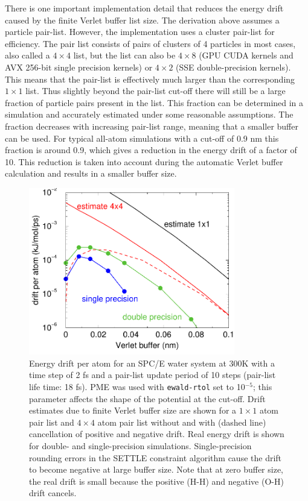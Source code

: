 {There is one important implementation detail that reduces the energy
drift caused by the finite Verlet buffer list size. The derivation
above assumes a particle pair-list. However, the {\gromacs}
implementation uses a cluster pair-list for efficiency. The pair list
consists of pairs of clusters of 4 particles in most cases, also
called a $4 \times 4$ list, but the list can also be $4 \times 8$ (GPU
CUDA kernels and AVX 256-bit single precision kernels) or $4 \times 2$
(SSE double-precision kernels). This means that the pair-list is
effectively much larger than the corresponding $1 \times 1$ list. Thus
slightly beyond the pair-list cut-off there will still be a large
fraction of particle pairs present in the list. This fraction can be
determined in a simulation and accurately estimated under some
reasonable assumptions. The fraction decreases with increasing
pair-list range, meaning that a smaller buffer can be used. For
typical all-atom simulations with a cut-off of 0.9 nm this fraction is
around 0.9, which gives a reduction in the energy drift of a factor of
10. This reduction is taken into account during the automatic Verlet
buffer calculation and results in a smaller buffer size.

\begin{figure}
\centerline{\includegraphics[width=9cm]{plots/verlet-drift}}
\caption {Energy drift per atom for an SPC/E water system at 300K with
  a time step of 2 fs and a pair-list update period of 10 steps
  (pair-list life time: 18 fs). PME was used with {\tt ewald-rtol} set
  to 10$^{-5}$; this parameter affects the shape of the potential at
  the cut-off. Drift estimates due to finite Verlet buffer size are
  shown for a $1 \times 1$ atom pair list and $4 \times 4$ atom pair
  list without and with (dashed line) cancellation of positive and
  negative drift. Real energy drift is shown for double- and
  single-precision simulations. Single-precision rounding errors in
  the SETTLE constraint algorithm cause the drift to become negative
  at large buffer size. Note that at zero buffer size, the real drift
  is small because the positive (H-H) and negative (O-H) drift
  cancels.}
\label{fig:verletdrift}
\end{figure}

}
